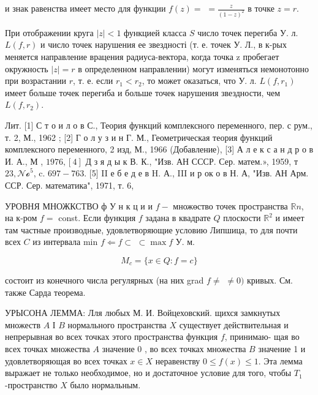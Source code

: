 \documentclass[10pt]{article}
\begin{document}
и знак равенства имеет место для функции $f(z)=$ $=\frac{z}{(1-z)^{2}}$ в точке $z=r$.



При отображении круга $|z|<1$ функцией класса $S$ число точек перегиба У. л. $L(f, r)$ и число точек нарушения ее звездності (т. е. точек У. Л., в к-рых меняется направление врацения радиуса-вектора, когда точка z пробегает окружность $|z|=r$ в определенном направлении) могут изменяться немонотонно при возрастании $r$, т. е. если $r_{1}<r_{2}$, то может оказаться, что У. л. $L\left(f, r_{1}\right)$ имеет больше точек перегиба и больше точек нарушения звездности, чем $L\left(f, r_{2}\right)$.



Лит. [1] С т о и л о в С., Теория функций комплексного переменного, пер. с рум., т. 2, М., 1962 ; [2] Г о л у з и н Г. М., Геометрическая теория функций комплексного переменного, 2 изд, М., 1966 (Добавление), [3] А л е к с а н д р о в И. А., М , $1976,[4]$ Д з я д ы к В. К., "Изв. АН СССР. Сер. матем.», 1959, т $23, \mathcal{N o}^{5}$, c. $697-763$. [5] II е б е д е в H. А., III и р ок о в Н. А, "Изв. АН Арм. ССР. Сер. математика", 1971, т. 6,



УРОВНЯ МНОЖКСТВО ф У н к ц и и $f-$ множөство точек пространства $\mathbb{R} n$, на к-ром $f=$ const. Если функция $f$ задана в квадрате $Q$ плоскости $\mathbb{R}^{2}$ и имеет там частные производные, удовлетворяющие условию Липшица, то для почти всех $C$ из интервала min $f \Leftarrow f \subset$ $\subset \max f$ У. м.



\[

M_{c}=\{x \in Q: f=c\}

\]



состоит из конечного числа регулярных (на них grad $f \neq$ $\neq 0)$ кривых. См. также Сарда теорема.



УРЫСОНА ЛЕММА: Лля любых М. И. Войцеховский. щихся замкнутых множеств $A$ І $B$ нормального пространства $X$ существует действительная и непрерывная во всех точках этого пространства функция $f$, принимаю- щая во всех точках множества $A$ значение 0 , во всех точках множества $B$ значение 1 и удовлетворяющая во всех точках $x \in X$ неравенству $0 \leqslant f(x) \leqslant 1$. Эта лемма выражает не только необходимое, но и достаточное условие для того, чтобы $T_{1}$-пространство $X$ было нормальным.
\end{document}
